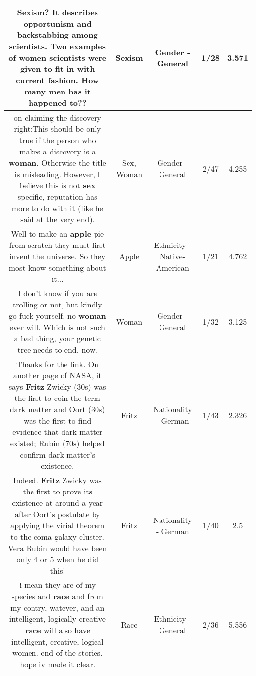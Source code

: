 \documentclass[11pt]{article}
\newlength\mylength
\begin{document}
\begin{center}
\begin{longtable}{|C{.65\mylength}|C{.30\mylength}|C{.12\mylength}|C{.12\mylength}|C{.12\mylength}|}
  \small Sexism?
It describes opportunism and backstabbing among scientists. Two examples of women scientists were given to fit in with current fashion. 
How many men has it happened to??\normalsize   & Sexism & Gender - General & 1/28 & 3.571 \\  \hline
  \small on claiming the discovery right:This should be only true if the person who makes a discovery is a \textbf{woman}. Otherwise the title is misleading. However, I believe this is not \textbf{sex} specific, reputation has more to do with it (like he said at the very end).\normalsize   & Sex, Woman & Gender - General & 2/47 & 4.255 \\  \hline
  \small Well to make an \textbf{apple} pie from scratch they must first invent the universe. So they most know something about it...\normalsize   & Apple & Ethnicity - Native-American & 1/21 & 4.762 \\  \hline
  \small I don't know if you are trolling or not, but kindly go fuck yourself, no \textbf{woman} ever will.  Which is not such a bad thing, your genetic tree needs to end, now.\normalsize   & Woman & Gender - General & 1/32 & 3.125 \\  \hline
  \small Thanks for the link. On another page of NASA, it says \textbf{Fritz} Zwicky (30s) was the first to coin the term dark matter and Oort (30s) was the first to find evidence that dark matter existed; Rubin (70s) helped confirm dark matter's existence.\normalsize   & Fritz & Nationality - German & 1/43 & 2.326 \\  \hline
  \small Indeed. \textbf{Fritz} Zwicky was the first to prove its existence at around a year after Oort's postulate by applying the virial theorem to the coma galaxy cluster. Vera Rubin would have been only 4 or 5 when he did this!\normalsize   & Fritz & Nationality - German & 1/40 & 2.5 \\  \hline
  \small i mean they are of my species and \textbf{race} and from my contry, watever, and an intelligent, logically creative \textbf{race} will also have intelligent, creative, logical women. end of the stories. hope iv made it clear.\normalsize   & Race & Ethnicity - General & 2/36 & 5.556 \\  \hline

\end{longtable}
\end{center}
\end{document}
